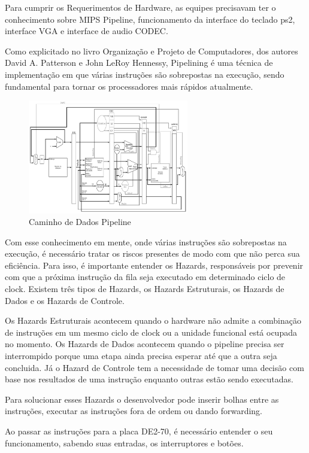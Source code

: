 \documentclass{vgtc}                          %
\begin{document}
Para cumprir os Requerimentos de Hardware, as equipes precisavam ter o conhecimento sobre MIPS Pipeline, funcionamento da interface do teclado ps2, interface VGA e interface de audio CODEC.

Como explicitado no livro Organização e Projeto de Computadores, dos autores David A. Patterson e John LeRoy Hennessy, Pipelining é uma técnica de implementação em que várias instruções são sobrepostas na execução, sendo fundamental para tornar os processadores mais rápidos atualmente. 

\begin{figure}[htb]
  \centering
  \includegraphics[width=2.76in]{pipeline.jpg}
 \caption{Caminho de Dados Pipeline}
\end{figure}

 
Com esse conhecimento em mente, onde várias instruções são sobrepostas na execução, é necessário tratar os riscos presentes de modo com que não perca sua eficiência. Para isso, é importante entender os Hazards, responsáveis por prevenir com que a próxima instrução da fila seja executado em determinado ciclo de clock. Existem três tipos de Hazards, os Hazards Estruturais, os Hazards de Dados e os Hazards de Controle.

Os Hazards Estruturais acontecem quando o hardware não admite a combinação de instruções em um mesmo ciclo de clock ou a unidade funcional está ocupada no momento. Os Hazards de Dados acontecem quando o pipeline precisa ser interrompido porque uma etapa ainda precisa esperar até que a outra seja concluida. Já o Hazard de Controle tem a necessidade de tomar uma decisão com base nos resultados de uma instrução enquanto outras estão sendo executadas.

Para solucionar esses Hazards o desenvolvedor pode inserir bolhas entre as instruções, executar as instruções fora de ordem ou dando forwarding.

Ao passar as instruções para a placa DE2-70, é necessário entender o seu funcionamento, sabendo suas entradas, os interruptores e botões.
\end{document}
